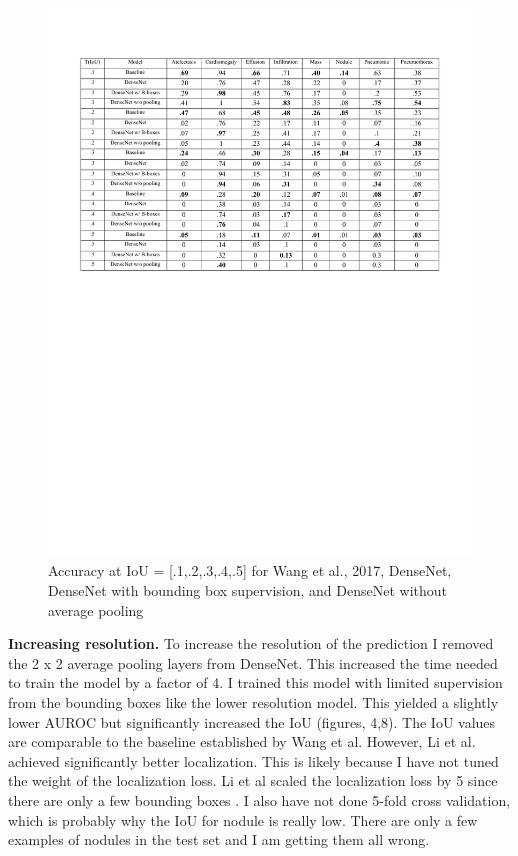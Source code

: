 \documentclass{article}
\begin{document}
\begin{figure}[ht]
\vskip 0.2in
\begin{center}
\centerline{\includegraphics[width=\columnwidth]{figure_8}}
\caption{Accuracy at IoU = [.1,.2,.3,.4,.5] for Wang et al., 2017, DenseNet, DenseNet with bounding box supervision, and DenseNet without average pooling}
\label{figure 8:}
\end{center}
\vskip -0.2in
\end{figure}

{\bf Increasing resolution.} To increase the resolution of the prediction I removed the 2 x 2 average pooling layers from DenseNet. This increased the time needed to train the model by a factor of 4. I trained this model with limited supervision from the bounding boxes like the lower resolution model. This yielded a slightly lower AUROC but significantly increased the IoU (figures, 4,8). The IoU values are comparable to the baseline established by Wang et al. However, Li et al. achieved significantly better localization. This is likely because I have not tuned the weight of the localization loss. Li et al scaled the localization loss by 5 since there are only a few bounding boxes \cite{Li}. I also have not done 5-fold cross validation, which is probably why the IoU for nodule is really low. There are only a few examples of nodules in the test set and I am getting them all wrong.
\end{document}
